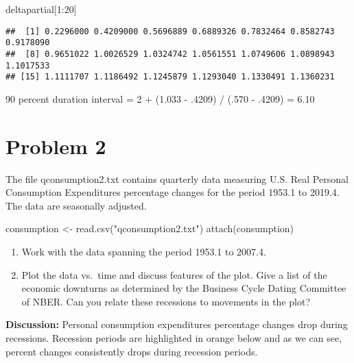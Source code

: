 \documentclass[
]{article}
\newenvironment{Shaded}{\begin{snugshade}}{\end{snugshade}}
\newcommand{\DecValTok}[1]{\textcolor[rgb]{0.00,0.00,0.81}{#1}}
\newcommand{\FunctionTok}[1]{\textcolor[rgb]{0.00,0.00,0.00}{#1}}
\newcommand{\NormalTok}[1]{#1}
\newcommand{\OtherTok}[1]{\textcolor[rgb]{0.56,0.35,0.01}{#1}}
\newcommand{\SpecialCharTok}[1]{\textcolor[rgb]{0.00,0.00,0.00}{#1}}
\newcommand{\StringTok}[1]{\textcolor[rgb]{0.31,0.60,0.02}{#1}}
\begin{document}
\begin{Shaded}
\begin{Highlighting}[]
\NormalTok{deltapartial[}\DecValTok{1}\SpecialCharTok{:}\DecValTok{20}\NormalTok{]}
\end{Highlighting}
\end{Shaded}

\begin{verbatim}
##  [1] 0.2296000 0.4209000 0.5696889 0.6889326 0.7832464 0.8582743 0.9178090
##  [8] 0.9651022 1.0026529 1.0324742 1.0561551 1.0749606 1.0898943 1.1017533
## [15] 1.1111707 1.1186492 1.1245879 1.1293040 1.1330491 1.1360231
\end{verbatim}

90 percent duration interval = 2 + (1.033 - .4209) / (.570 - .4209) =
6.10

\hypertarget{problem-2}{%
\section{Problem 2}\label{problem-2}}

The file qconsumption2.txt contains quarterly data measuring U.S. Real
Personal Consumption Expenditures percentage changes for the period
1953.1 to 2019.4. The data are seasonally adjusted.

\begin{Shaded}
\begin{Highlighting}[]
\NormalTok{consumption }\OtherTok{\textless{}{-}} \FunctionTok{read.csv}\NormalTok{(}\StringTok{"qconsumption2.txt"}\NormalTok{)}
\FunctionTok{attach}\NormalTok{(consumption)}
\end{Highlighting}
\end{Shaded}

\begin{enumerate}
\def\labelenumi{(\alph{enumi})}
\item
  Work with the data spanning the period 1953.1 to 2007.4.
\item
  Plot the data vs.~time and discuss features of the plot. Give a list
  of the economic downturns as determined by the Business Cycle Dating
  Committee of NBER. Can you relate these recessions to movements in the
  plot?
\end{enumerate}

\textbf{Discussion:} Personal consumption expenditures percentage
changes drop during recessions. Recession periods are highlighted in
orange below and as we can see, percent changes consistently drops
during recession periods.
\end{document}
